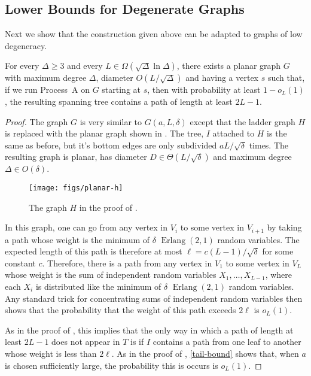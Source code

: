 \documentclass[lotsofwhite]{patmorin}
\DeclareMathOperator{\erlang}{Erlang}
\begin{document}
\subsection{Lower Bounds for Degenerate Graphs}

Next we show that the construction given above can be adapted to graphs
of low degeneracy.

\begin{thm}
  For every $\Delta\ge 3$ and every $L\in\Omega(\sqrt{\Delta}\ln\Delta)$,
  there exists a planar graph $G$ with maximum degree $\Delta$, diameter
  $O(L/\sqrt{\Delta})$ and having a vertex $s$ such that, if we run
  Process~A on $G$ starting at $s$, then with probability at least
  $1-o_L(1)$, the resulting spanning tree contains a path of length at
  least $2L-1$.
\end{thm}

\begin{proof}
  The graph $G$ is very similar to $G(a, L,\delta)$ except that the ladder
  graph $H$ is replaced with the planar graph shown in .
  The tree, $I$ attached to $H$ is the same as before, but it's bottom
  edges are only subdivided $aL/\sqrt{\delta}$ times.  The resulting
  graph is planar, has diameter $D\in\Theta(L/\sqrt{\delta})$ and maximum
  degree $\Delta\in O(\delta)$.

  \begin{figure}
    \begin{center}
      \texttt{[image: figs/planar-h]}
    \end{center}
    \caption{The graph $H$ in the proof of .}
  \end{figure}
 
  In this graph, one can go from any vertex in $V_i$ to some vertex in 
  $V_{i+1}$ by taking a path
  whose weight is the minimum of $\delta$ $\erlang(2,1)$ random
  variables.  The expected length of this path is therefore at most
  $\ell=c(L-1)/\sqrt{\delta}$ for some constant $c$. Therefore, there is
  a path from any vertex in $V_1$ to some vertex in $V_L$ whose weight is
  the sum of independent random variables $X_1,\ldots,X_{L-1}$, where each
  $X_i$ is distributed like the minimum of $\delta$ $\erlang(2,1)$ random
  variables. Any standard trick for concentrating sums of independent
  random variables then shows that the probability that the weight of
  this path exceeds $2\ell$ is $o_L(1)$.

  As in the proof of , this implies
  that the only way in which a path of length at least $2L-1$ does not
  appear in $T$ is if $I$ contains a path from one leaf to another whose
  weight is less than $2\ell$.  As in the proof of ,
  \eqref{tail-bound} shows that, when $a$ is chosen sufficiently large,
  the probability this is occurs is $o_L(1)$.
\end{proof}
\end{document}
